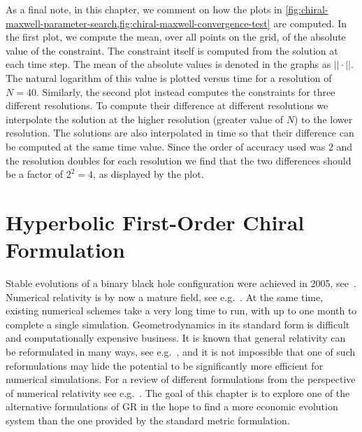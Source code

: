 \documentclass[10pt]{report}
\theoremstyle{definition}
\begin{document}
As a final note, in this chapter, we comment on how the plots in \cref{fig:chiral-maxwell-parameter-search,fig:chiral-maxwell-convergence-test} are computed. In the first plot, we compute the mean, over all points on the grid, of the absolute value of the constraint. The constraint itself is computed from the solution at each time step. The mean of the absolute values is denoted in the graphs as $||\cdot||$. The natural logarithm of this value is plotted versus time for a resolution of $N=40$. Similarly, the second plot instead computes the constraints for three different resolutions. To compute their difference at different resolutions we interpolate the solution at the higher resolution (greater value of $N$) to the lower resolution. The solutions are also interpolated in time so that their difference can be computed at the same time value. Since the order of accuracy used was $2$ and the resolution doubles for each resolution we find that the two differences should be a factor of $2^2 = 4$, as displayed by the plot.




    \newpage
\chapter{Hyperbolic First-Order Chiral Formulation} \label{chap:plebanski-numerical-relativity}

    Stable evolutions of a binary black hole configuration were achieved in 2005, see~\cite{Evolution_of_Bi_Pretor_2005,Gravitational_w_Baker_2005}. Numerical relativity is by now a mature field, see e.g.~\cite{NumericalRelatBaumga2010}. At the same time, existing numerical schemes take a very long time to run, with up to one month to complete a single simulation. Geometrodynamics in its standard form is difficult and computationally expensive business. It is known that general relativity can be reformulated in many ways, see e.g.~\cite{FormGenRelGravity2020}, and it is not impossible that one of such reformulations may hide the potential to be significantly more efficient for numerical simulations. For a review of different formulations from the perspective of numerical relativity see e.g.~\cite{Formulations_of_Shinka_2008}. The goal of this chapter is to explore one of the alternative formulations of GR in the hope to find a more economic evolution system than the one provided by the standard metric formulation. 
\end{document}
